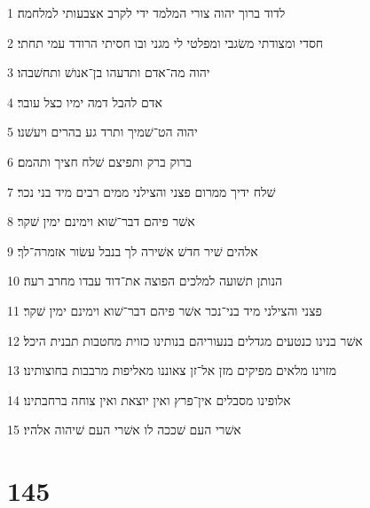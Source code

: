 \par 1 לדוד ברוך יהוה צורי המלמד ידי לקרב אצבעותי למלחמה׃
\par 2 חסדי ומצודתי משׂגבי ומפלטי לי מגני ובו חסיתי הרודד עמי תחתי׃
\par 3 יהוה מה־אדם ותדעהו בן־אנושׁ ותחשׁבהו׃
\par 4 אדם להבל דמה ימיו כצל עובר׃
\par 5 יהוה הט־שׁמיך ותרד גע בהרים ויעשׁנו׃
\par 6 ברוק ברק ותפיצם שׁלח חציך ותהמם׃
\par 7 שׁלח ידיך ממרום פצני והצילני ממים רבים מיד בני נכר׃
\par 8 אשׁר פיהם דבר־שׁוא וימינם ימין שׁקר׃
\par 9 אלהים שׁיר חדשׁ אשׁירה לך בנבל עשׂור אזמרה־לך׃
\par 10 הנותן תשׁועה למלכים הפוצה את־דוד עבדו מחרב רעה׃
\par 11 פצני והצילני מיד בני־נכר אשׁר פיהם דבר־שׁוא וימינם ימין שׁקר׃
\par 12 אשׁר בנינו כנטעים מגדלים בנעוריהם בנותינו כזוית מחטבות תבנית היכל׃
\par 13 מזוינו מלאים מפיקים מזן אל־זן צאוננו מאליפות מרבבות בחוצותינו׃
\par 14 אלופינו מסבלים אין־פרץ ואין יוצאת ואין צוחה ברחבתינו׃
\par 15 אשׁרי העם שׁככה לו אשׁרי העם שׁיהוה אלהיו׃

\chapter{145}

